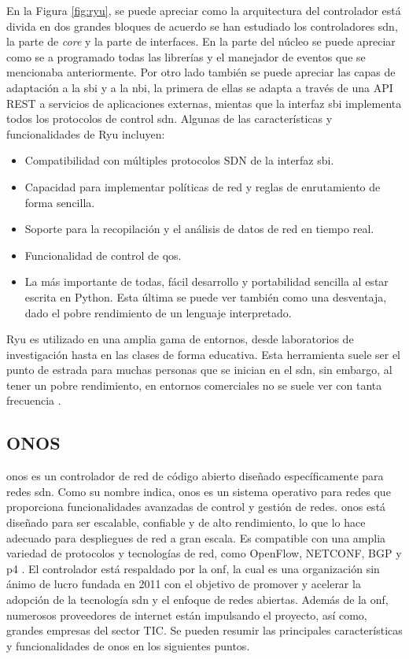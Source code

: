En la Figura \ref*{fig:ryu}, se puede apreciar como la arquitectura del controlador está divida en dos grandes bloques de acuerdo se han estudiado los controladores \gls{sdn}, la parte de \textit{core} y la parte de interfaces. En la parte del núcleo se puede apreciar como se a programado todas las librerías y el manejador de eventos que se mencionaba anteriormente. Por otro lado también se puede apreciar las capas de adaptación a la \gls{sbi} y a la \gls{nbi}, la primera de ellas se adapta a través de una API REST a servicios de aplicaciones externas, mientas que la interfaz \gls{sbi} implementa todos los protocolos de control \gls{sdn}. Algunas de las características y funcionalidades de Ryu incluyen:

\begin{itemize}
    \item Compatibilidad con múltiples protocolos SDN de la interfaz \gls{sbi}.
    \item Capacidad para implementar políticas de red y reglas de enrutamiento de forma sencilla.
    \item Soporte para la recopilación y el análisis de datos de red en tiempo real.
    \item Funcionalidad de control de \gls{qos}.
    \item La más importante de todas, fácil desarrollo y portabilidad sencilla al estar escrita en Python. Esta última se puede ver también como una desventaja, dado el pobre rendimiento de un lenguaje interpretado.
\end{itemize}

Ryu es utilizado en una amplia gama de entornos, desde laboratorios de investigación hasta en las clases de forma educativa. Esta herramienta suele ser el punto de estrada para muchas personas que se inician en el \gls{sdn}, sin embargo, al tener un pobre rendimiento, en entornos comerciales no se suele ver con tanta frecuencia \cite{tomonori2013introduction}.

\subsection{ONOS}
\label{subsec:ONOS}

\gls{onos} es un controlador de red de código abierto diseñado específicamente para redes \gls{sdn}. Como su nombre indica, \gls{onos} es un sistema operativo para redes que proporciona funcionalidades avanzadas de control y gestión de redes. \gls{onos} está diseñado para ser escalable, confiable y de alto rendimiento, lo que lo hace adecuado para despliegues de red a gran escala. Es compatible con una amplia variedad de protocolos y tecnologías de red, como OpenFlow, NETCONF, BGP y \gls{p4} \cite{onos3}. El controlador está respaldado por la \gls{onf}, la cual es una organización sin ánimo de lucro fundada en 2011 con el objetivo de promover y acelerar la adopción de la tecnología \gls{sdn} y el enfoque de redes abiertas. Además de la \gls{onf}, numerosos proveedores de internet están impulsando el proyecto, así como, grandes empresas del sector TIC. Se pueden resumir las principales características y funcionalidades de \gls{onos} en los siguientes puntos.

